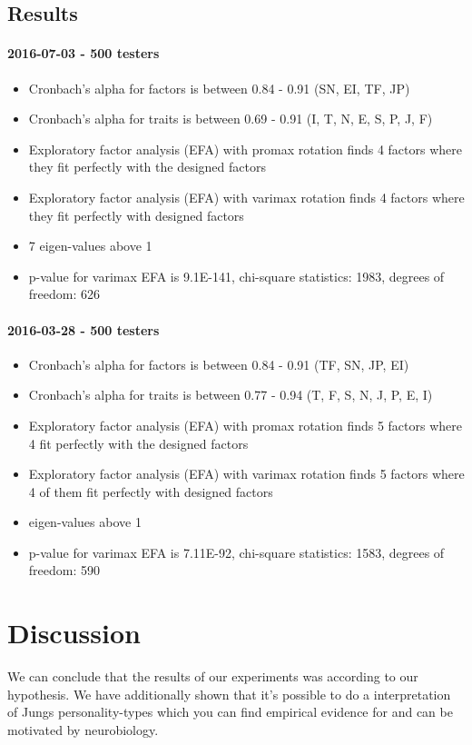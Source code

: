 \documentclass[11pt,a4paper]{article}
\begin{document}
\subsection{Results}

\paragraph{2016-07-03 - 500 testers}
\begin{itemize}
\item Cronbach's alpha for factors is between 0.84 - 0.91 (SN, EI, TF, JP)
\item Cronbach's alpha for traits is between 0.69 - 0.91 (I, T, N, E, S, P, J, F)
\item Exploratory factor analysis (EFA) with promax rotation finds 4 factors where they fit perfectly with the designed factors
\item Exploratory factor analysis (EFA) with varimax rotation finds 4 factors where they fit perfectly with designed factors
\item 7 eigen-values above 1
\item p-value for varimax EFA is 9.1E-141, chi-square statistics: 1983, degrees of freedom: 626
\end{itemize}

\paragraph{2016-03-28 - 500 testers}
\begin{itemize}
\item Cronbach's alpha for factors is between 0.84 - 0.91 (TF, SN, JP, EI)
\item Cronbach's alpha for traits is between 0.77 - 0.94 (T, F, S, N, J, P, E, I)
\item Exploratory factor analysis (EFA) with promax rotation finds 5 factors where 4 fit perfectly with the designed factors
\item Exploratory factor analysis (EFA) with varimax rotation finds 5 factors where 4 of them fit perfectly with designed factors
\item eigen-values above 1
\item p-value for varimax EFA is 7.11E-92, chi-square statistics: 1583, degrees of freedom: 590
\end{itemize}

\section{Discussion}
We can conclude that the results of our experiments was according to our hypothesis. We have additionally shown that it's possible to do a interpretation of Jungs personality-types which you can find empirical evidence for and can be motivated by neurobiology.
\end{document}
